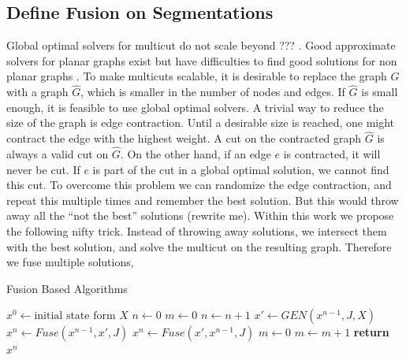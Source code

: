 \documentclass[10pt,twocolumn,letterpaper]{article}
\begin{document}



\subsection{Define Fusion on Segmentations}



Global optimal solvers for multicut do not scale beyond ??? \cite{???}.
Good approximate solvers for planar graphs exist \cite{beier_2014_cvpr,yarkony_2012_eccv} 
but have difficulties to find good solutions for non planar graphs \cite{beier_2014_cvpr}.
%
To make multicuts scalable, it is desirable to replace the graph $G$
with a graph $\hat{G}$, which is smaller in the number of nodes and edges. 
If $\hat{G}$ is small enough, it is feasible to use global optimal solvers.
%
A trivial way to reduce the size of the graph  is edge contraction.
Until a desirable size is reached, one might contract the edge with
the highest weight. A cut on the contracted graph  $\hat{G}$ is always
a valid cut on $\hat{G}$.
%
On the other hand, if an edge $e$ is contracted, it will never be cut.
If $e$ is part of the cut in a global optimal solution, we cannot find
this cut.
%
To overcome this problem  we can randomize the edge contraction,
and repeat this multiple times and remember the best solution.
%
But this would throw away all the ``not the best'' solutions (rewrite me).
Within this work we propose the following nifty trick.
Instead of throwing away solutions, we intersect them with the 
best solution, and solve the multicut on the resulting
graph.
Therefore we fuse multiple solutions,



\begin{algorithm}
\begin{scriptsize}
\caption{Fusion Based Algorithms}\label{alg:fusion}
\begin{algorithmic}[1]
\State $x^0 \gets \textrm{initial state form } X$
\State $n \gets 0 $                                 
\State $m \gets 0 $                                 
\State $n \gets n+1$ 
 \State $x'\gets GEN(x^{n-1},J,X)$                    
   \State $x^{n} \gets Fuse(x^{n-1},x',J)$             
 \Else
   \State $x^{n} \gets Fuse(x',x^{n-1},J)$
 \EndIf
   \State $m \gets 0$                                 
 \Else
   \State $m \gets m+1$                               
 \EndIf
\EndWhile
\State \textbf{return} $x^n$
\EndProcedure
\end{algorithmic}
\end{scriptsize}
\end{algorithm}
\end{document}
